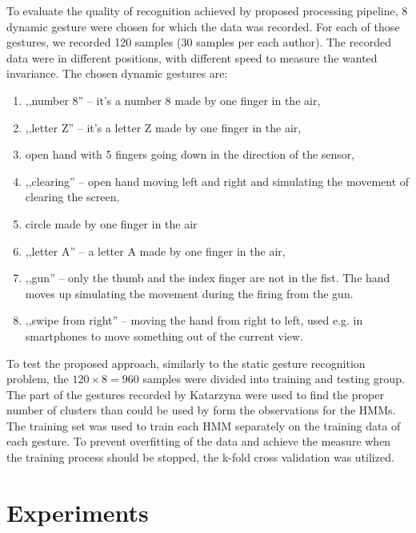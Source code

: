 To evaluate the quality of recognition achieved by proposed processing pipeline, 8 dynamic gesture were chosen for which the data was recorded.
For each of those gestures, we recorded 120 samples (30 samples per each author).
The recorded data were in different positions, with different speed to measure the wanted invariance.
The chosen dynamic gestures are:
\begin{enumerate}
\item ,,number 8'' -- it's a number 8 made by one finger in the air,
\item ,,letter Z'' -- it's a letter Z made by one finger in the air,
\item open hand with 5 fingers going down in the direction of the sensor,
\item ,,clearing'' -- open hand moving left and right and simulating the movement of clearing the screen,
\item circle made by one finger in the air
\item ,,letter A'' -- a letter A made by one finger in the air,
\item ,,gun'' -- only the thumb and the index finger are not in the fist. The hand moves up simulating the movement during the firing from the gun.
\item ,,swipe from right'' -- moving the hand from right to left, used e.g. in smartphones to move something out of the current view.
\end{enumerate}

To test the proposed approach, similarly to the static gesture recognition problem, the $120\times8=960$ samples were divided into training and testing group. 
The part of the gestures recorded by Katarzyna were used to find the proper number of clusters than could be used by form the observations for the HMMs. 
The training set was used to train each HMM separately on the training data of each gesture. 
To prevent overfitting of the data and achieve the measure when the training process should be stopped, the k-fold cross validation was utilized. 


\section{Experiments}




